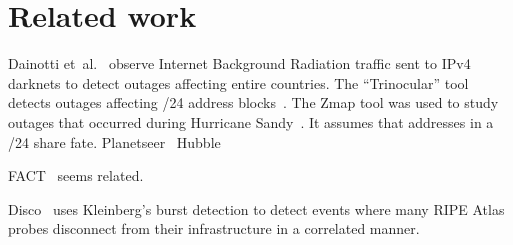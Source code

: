 
\section{Related work}
\label{sec:related}

Dainotti et~al.~\cite{dainotti-imc11} observe Internet Background Radiation traffic sent to IPv4 darknets to detect outages affecting entire countries. 
The ``Trinocular'' tool detects outages affecting /24 address blocks~\cite{trinocular}.
The Zmap tool was used to study outages that occurred during Hurricane Sandy~\cite{durumeric2013zmap}. It assumes that addresses in a /24 share fate.
Planetseer~\cite{planetseer}
Hubble~\cite{hubble}

FACT~\cite{fact-flowbased-connectivity} seems related.

Disco~\cite{disco} uses Kleinberg's burst detection to detect
events where many RIPE Atlas probes disconnect from
their infrastructure in a correlated manner.

